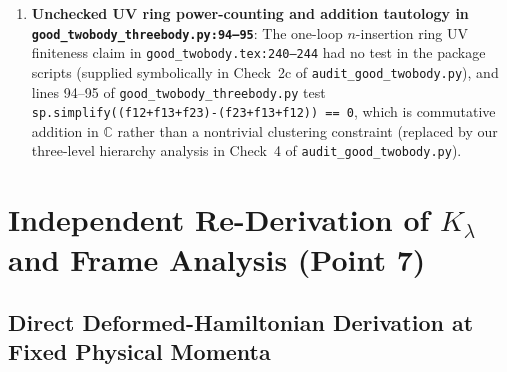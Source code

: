 \documentclass[11pt,a4paper]{article}
\newcommand{\dd}{\mathrm{d}}
\begin{document}
\begin{enumerate}
\begin{equation}
E_{\mathrm{reg}}(\Lambda) = \int_0^\Lambda \frac{\dd q}{2\pi}\sqrt{1+q^2}\,\theta'(q) + C_\Lambda M, \qquad C_\Lambda = -\frac{3\Lambda}{4\pi},
\end{equation}
confirming that $B_\Lambda$ cancels when subtracting the vacuum, $C_\Lambda M = -\frac{3k}{2\pi}\Lambda$ cancels the linear divergence of the phase-shift trace, and the $O(\Lambda^{-2})$ Richardson combination $(4E_{\mathrm{reg}}(2\Lambda) - E_{\mathrm{reg}}(\Lambda))/3$ matches $E_{\mathrm{m}}$ to $<10^{-17}$.
\item \textbf{Unchecked UV ring power-counting and addition tautology in \texttt{good\_twobody\_threebody.py:94--95}}: The one-loop $n$-insertion ring UV finiteness claim in \texttt{good\_twobody.tex:240--244} had no test in the package scripts (supplied symbolically in Check~2c of \texttt{audit\_good\_twobody.py}), and lines 94--95 of \texttt{good\_twobody\_threebody.py} test \texttt{sp.simplify((f12+f13+f23)-(f23+f13+f12)) == 0}, which is commutative addition in $\mathbb{C}$ rather than a nontrivial clustering constraint (replaced by our three-level hierarchy analysis in Check~4 of \texttt{audit\_good\_twobody.py}).
\end{enumerate}

\section{Independent Re-Derivation of $K_\lambda$ and Frame Analysis (Point 7)}

\subsection{Direct Deformed-Hamiltonian Derivation at Fixed Physical Momenta}
\end{document}
